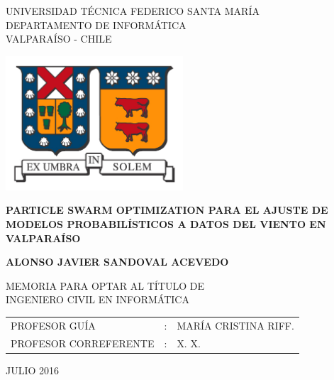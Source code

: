 
\begin{center}
  \begin{spacing}{1}
    {\large UNIVERSIDAD TÉCNICA FEDERICO SANTA MARÍA}\\
    DEPARTAMENTO DE INFORMÁTICA\\
    VALPARAÍSO - CHILE
  \end{spacing}

  \vspace{12mm}
  \includegraphics[height=50mm]{figures/usm_logo.png}
  \vspace{15mm}

  \begin{spacing}{1.5} 
    \textbf{\large PARTICLE SWARM OPTIMIZATION PARA EL AJUSTE DE MODELOS
      PROBABILÍSTICOS A DATOS DEL VIENTO EN VALPARAÍSO}\\
  \end{spacing}

  \vspace{20mm}
  \textbf{\large ALONSO JAVIER SANDOVAL ACEVEDO}
  \vspace{12mm}

  \begin{spacing}{1.25} 
    MEMORIA PARA OPTAR AL TÍTULO DE\\
    INGENIERO CIVIL EN INFORMÁTICA
  \end{spacing}

  \vspace{15mm}
  \begin{table}[h]
    \begin{center}
      \begin{tabular}{ l c l }
        PROFESOR GUÍA & : & MARÍA CRISTINA RIFF.\\
        PROFESOR CORREFERENTE & : & X. X.\\
      \end{tabular}
    \end{center}
  \end{table}

  \vfill
  \large JULIO 2016
\end{center}
